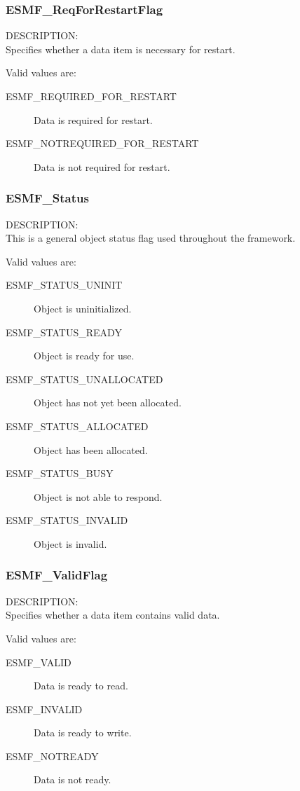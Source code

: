 \subsubsection{ESMF\_ReqForRestartFlag}
\label{opt:reqforrestartflag}
{\sf DESCRIPTION:\\}
Specifies whether a data item is necessary for restart.

Valid values are:
\begin{description}
   \item [ESMF\_REQUIRED\_FOR\_RESTART] 
         Data is required for restart.
   \item [ESMF\_NOTREQUIRED\_FOR\_RESTART]
         Data is not required for restart.
\end{description}

\subsubsection{ESMF\_Status}
\label{opt:status}
{\sf DESCRIPTION:\\}
This is a general object status flag used throughout the
framework.

Valid values are:
\begin{description}
   \item [ESMF\_STATUS\_UNINIT] 
         Object is uninitialized.
   \item [ESMF\_STATUS\_READY]
         Object is ready for use.
   \item [ESMF\_STATUS\_UNALLOCATED]
         Object has not yet been allocated.
   \item [ESMF\_STATUS\_ALLOCATED]
         Object has been allocated.
   \item [ESMF\_STATUS\_BUSY]
         Object is not able to respond.
   \item [ESMF\_STATUS\_INVALID]
         Object is invalid.
\end{description}


\subsubsection{ESMF\_ValidFlag}
\label{opt:validflag}
{\sf DESCRIPTION:\\}
Specifies whether a data item contains valid data.

Valid values are:
\begin{description}
   \item [ESMF\_VALID] 
         Data is ready to read.
   \item [ESMF\_INVALID]
         Data is ready to write.
   \item [ESMF\_NOTREADY]
         Data is not ready.
\end{description}


